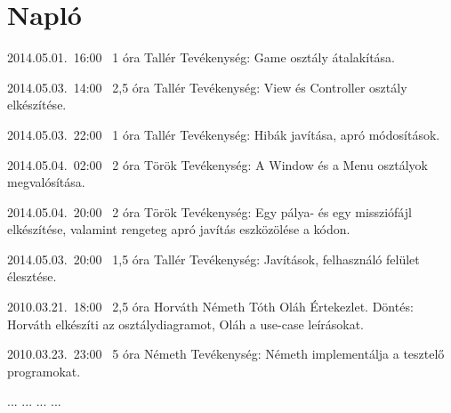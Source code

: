 %
\section{Napló}

\begin{naplo}

\bejegyzes
{2014.05.01.~16:00~}
{1 óra}
{Tallér}
{Tevékenység: Game osztály átalakítása.}

\bejegyzes
{2014.05.03.~14:00~}
{2,5 óra}
{Tallér}
{Tevékenység: View és Controller osztály elkészítése.}

\bejegyzes
{2014.05.03.~22:00~}
{1 óra}
{Tallér}
{Tevékenység: Hibák javítása, apró módosítások.}

\bejegyzes
{2014.05.04.~02:00~}
{2 óra}
{Török}
{Tevékenység: A Window és a Menu osztályok megvalósítása.}

\bejegyzes
{2014.05.04.~20:00~}
{2 óra}
{Török}
{Tevékenység: Egy pálya- és egy missziófájl elkészítése, valamint rengeteg apró javítás eszközölése a kódon.}

\bejegyzes
{2014.05.03.~20:00~}
{1,5 óra}
{Tallér}
{Tevékenység: Javítások, felhasználó felület élesztése.}

\bejegyzes
{2010.03.21.~18:00~} %
{2,5 óra} %
{Horváth\newline
Németh\newline
Tóth\newline
Oláh} %
{Értekezlet. Döntés: Horváth elkészíti az osztálydiagramot, Oláh a use-case leírásokat.} %

\bejegyzes
{2010.03.23.~23:00~}
{5 óra}
{Németh}
{Tevékenység: Németh implementálja a tesztelő programokat.}

\bejegyzes
{...}
{...}
{...}
{...}


\end{naplo}

